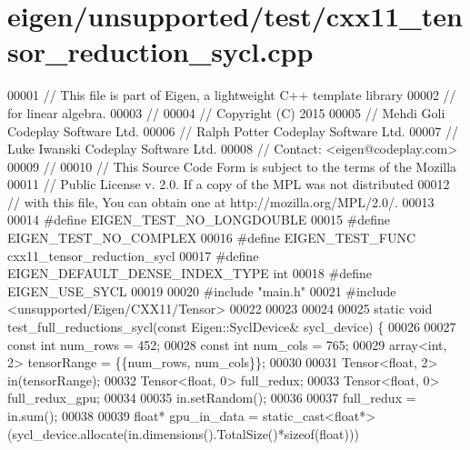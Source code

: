\hypertarget{eigen_2unsupported_2test_2cxx11__tensor__reduction__sycl_8cpp_source}{}\section{eigen/unsupported/test/cxx11\+\_\+tensor\+\_\+reduction\+\_\+sycl.cpp}
\label{eigen_2unsupported_2test_2cxx11__tensor__reduction__sycl_8cpp_source}

\begin{DoxyCode}
00001 \textcolor{comment}{// This file is part of Eigen, a lightweight C++ template library}
00002 \textcolor{comment}{// for linear algebra.}
00003 \textcolor{comment}{//}
00004 \textcolor{comment}{// Copyright (C) 2015}
00005 \textcolor{comment}{// Mehdi Goli    Codeplay Software Ltd.}
00006 \textcolor{comment}{// Ralph Potter  Codeplay Software Ltd.}
00007 \textcolor{comment}{// Luke Iwanski  Codeplay Software Ltd.}
00008 \textcolor{comment}{// Contact: <eigen@codeplay.com>}
00009 \textcolor{comment}{//}
00010 \textcolor{comment}{// This Source Code Form is subject to the terms of the Mozilla}
00011 \textcolor{comment}{// Public License v. 2.0. If a copy of the MPL was not distributed}
00012 \textcolor{comment}{// with this file, You can obtain one at http://mozilla.org/MPL/2.0/.}
00013 
00014 \textcolor{preprocessor}{#define EIGEN\_TEST\_NO\_LONGDOUBLE}
00015 \textcolor{preprocessor}{#define EIGEN\_TEST\_NO\_COMPLEX}
00016 \textcolor{preprocessor}{#define EIGEN\_TEST\_FUNC cxx11\_tensor\_reduction\_sycl}
00017 \textcolor{preprocessor}{#define EIGEN\_DEFAULT\_DENSE\_INDEX\_TYPE int}
00018 \textcolor{preprocessor}{#define EIGEN\_USE\_SYCL}
00019 
00020 \textcolor{preprocessor}{#include "main.h"}
00021 \textcolor{preprocessor}{#include <unsupported/Eigen/CXX11/Tensor>}
00022 
00023 
00024 
00025 \textcolor{keyword}{static} \textcolor{keywordtype}{void} test\_full\_reductions\_sycl(\textcolor{keyword}{const} Eigen::SyclDevice&  sycl\_device) \{
00026 
00027   \textcolor{keyword}{const} \textcolor{keywordtype}{int} num\_rows = 452;
00028   \textcolor{keyword}{const} \textcolor{keywordtype}{int} num\_cols = 765;
00029   array<int, 2> tensorRange = \{\{num\_rows, num\_cols\}\};
00030 
00031   Tensor<float, 2> in(tensorRange);
00032   Tensor<float, 0> full\_redux;
00033   Tensor<float, 0> full\_redux\_gpu;
00034 
00035   in.setRandom();
00036 
00037   full\_redux = in.sum();
00038 
00039   \textcolor{keywordtype}{float}* gpu\_in\_data = \textcolor{keyword}{static\_cast<}\textcolor{keywordtype}{float}*\textcolor{keyword}{>}(sycl\_device.allocate(in.dimensions().TotalSize()*\textcolor{keyword}{sizeof}(float)))

\end{DoxyCode}
